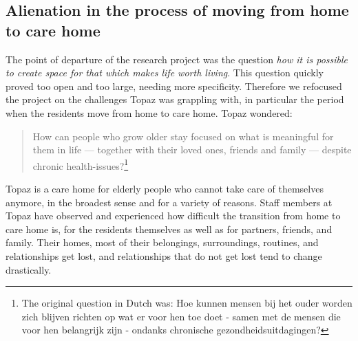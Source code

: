 \documentclass[authordate, empirical]{jote-new-article}
\begin{document}
	\subsection{Alienation in the process of moving from home to care home}



	The point of departure of the research project was the question \emph{how it is possible to create space for that which makes life worth living}. This question quickly proved too open and too large, needing more specificity. Therefore we refocused the project on the challenges Topaz was grappling with, in particular the period when the residents move from home to care home. Topaz wondered:





	\begin{quote}
		
		How can people who grow older stay focused on what is meaningful for them in life — together with their loved ones, friends and family — despite chronic health-issues?\footnote{ The original question in Dutch was: Hoe kunnen mensen bij het ouder worden zich blijven richten op wat er voor hen toe doet - samen met de mensen die voor hen belangrijk zijn - ondanks chronische gezondheidsuitdagingen?}
	\end{quote}









	Topaz is a care home for elderly people who cannot take care of themselves anymore, in the broadest sense and for a variety of reasons. Staff members at Topaz have observed and experienced how difficult the transition from home to care home is, for the residents themselves as well as for partners, friends, and family. Their homes, most of their belongings, surroundings, routines, and relationships get lost, and relationships that do not get lost tend to change drastically.
\end{document}
